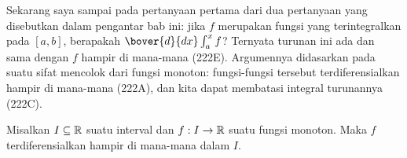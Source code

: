 


\def\chaptername{Teorema Dasar Kalkulus}
\def\sectionname{Mendiferensialkan integral tak tentu}
     
     
Sekarang saya sampai pada pertanyaan pertama dari dua pertanyaan yang
disebutkan dalam pengantar bab ini:  jika $f$ merupakan fungsi yang
terintegralkan pada $[a,b]$, berapakah $\bover{d}{dx}\int_a^xf$? Ternyata
turunan ini ada dan sama dengan $f$ hampir di mana-mana (222E). Argumennya
didasarkan pada suatu sifat mencolok dari fungsi monoton: fungsi-fungsi
tersebut terdiferensialkan hampir di mana-mana (222A), dan kita dapat
membatasi integral turunannya (222C).
     
 Misalkan $I\subseteq\Bbb R$ suatu interval dan
$f:I\to\Bbb R$ suatu fungsi monoton. Maka $f$ terdiferensialkan hampir
di mana-mana dalam $I$.
     
     
